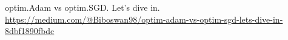 \documentclass[journal, a4paper]{IEEEtran}
\begin{document}




\begin{thebibliography}{999}

    	optim.Adam vs optim.SGD. Let’s dive in.
    	\url{https://medium.com/@Biboswan98/optim-adam-vs-optim-sgd-lets-dive-in-8dbf1890fbdc}
	
	    

\end{thebibliography}

\end{document}
